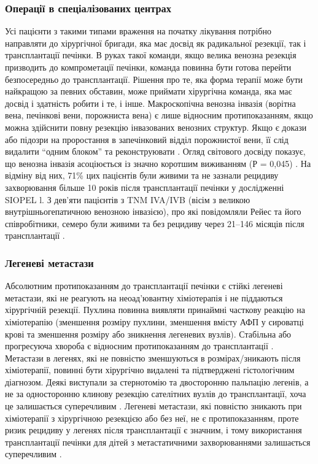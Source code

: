 \subsubsection{Операції в спеціалізованих центрах} 

Усі пацієнти з такими типами враження на початку лікування потрібно направляти до хірургічної бригади, яка має досвід як радикальної резекції, так і трансплантації печінки. В руках такої команди, якщо велика венозна резекція призводить до компрометації печінки, команда повинна бути готова перейти безпосередньо до трансплантації. Рішення про те, яка форма терапії може бути найкращою за певних обставин, може приймати хірургічна команда, яка має досвід і здатність робити і те, і інше.
Макроскопічна венозна інвазія (ворітна вена, печінкові вени, порожниста вена) є лише відносним протипоказанням, якщо можна здійснити повну резекцію інвазованих венозних структур. Якщо є докази або підозри на проростання в запечінковий відділ порожнистої вени, її слід видалити “одним блоком” та реконструювати \cite{pmid20345611}. Огляд світового досвіду показує, що венозна інвазія асоціюється із значно коротшим виживанням (Р = 0,045) \cite{pmid10466608}. На відміну від них, 71\% цих пацієнтів були живими та не зазнали рецидиву захворювання більше 10 років після трансплантації печінки у дослідженні SIOPEL l. З дев'яти пацієнтів з TNM IVA/IVB (вісім з великою внутрішньогепатичною венозною інвазією), про які повідомляли Рейес та його співробітники, семеро були живими та без рецидиву через 21–146 місяців після трансплантації \cite{pmid21509775}.

\subsubsection{Легеневі метастази} 
Абсолютним протипоказанням до трансплантації печінки є стійкі легеневі метастази, які не реагують на неоад’ювантну хіміотерапія і не піддаються хірургічній резекції. Пухлина повинна виявляти принаймні часткову реакцію на хіміотерапію (зменшення розміру пухлини, зменшення вмісту АФП у сироватці крові та зменшення розміру або зникнення легеневих вузлів). Стабільна або прогресуюча хвороба є відносним протипоказанням до трансплантації \cite{pmid16045186}. Метастази в легенях, які не повністю зменшуються в розмірах/зникають після хіміотерапії, повинні бути хірургічно видалені та підтверджені гістологічним діагнозом. Деякі виступали за стернотомію та двосторонню пальпацію легенів, а не за односторонню клинову резекцію сателітних вузлів до трансплантації, хоча це залишається суперечливим \cite{pmid11819207}. Легеневі метастази, які повністю зникають при хіміотерапії з хірургічною резекцією або без неї, не є протипоказанням, проте ризик рецидиву у легенях після трансплантації є значним, і тому використання трансплантації печінки для дітей з метастатичними захворюваннями залишається суперечливим \cite{pmid24852330}.

